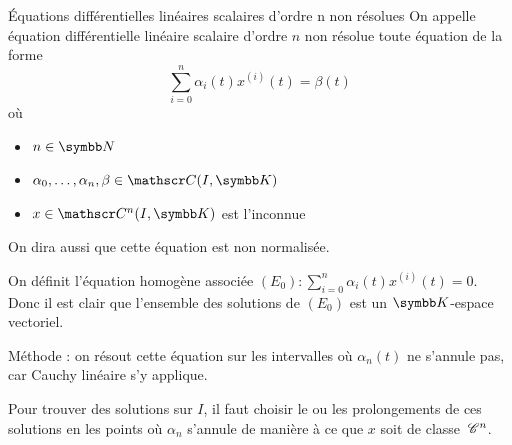 \lvspace \avspace \begin{definitionnt}{\'Equations différentielles linéaires scalaires d'ordre n non résolues}{}
    On appelle équation différentielle linéaire scalaire d'ordre $n$ non résolue toute
    équation de la forme
    $$\sum_{i=0}^{n} \alpha_i(t) x^{(i)}(t) = \beta(t)$$
    où 
    \begin{itemize}
        \item $n \in \N$
        \item $\alpha_0, \dots, \alpha_n, \beta \in \mathscr C(I, \K)$
        \item $x \in \mathscr C^n(I, \K)$ est l'inconnue
    \end{itemize}

    On dira aussi que cette équation est non normalisée. 

    On définit l'équation homogène associée $(E_0) : \sum_{i = 0}^{n} \alpha_i(t) x^{(i)}(t) = 0$.
    Donc il est clair que l'ensemble des solutions de $(E_0)$ est un $\K$-espace vectoriel.
\end{definitionnt}

Méthode : on résout cette équation sur les intervalles où $\alpha_n(t)$ ne s'annule pas, car 
Cauchy linéaire s'y applique. 

Pour trouver des solutions sur $I$, il faut choisir le ou les prolongements de ces solutions 
en les points où $\alpha_n$ s'annule de manière à ce que $x$ soit de classe $\,\mathscr C^{n}$.

